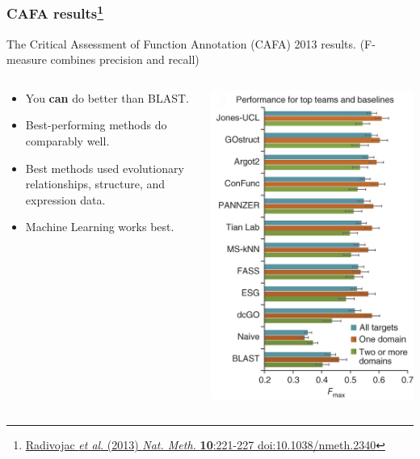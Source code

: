 \begin{frame}
  \frametitle{CAFA results\footnote{\tiny{\href{http://dx.doi.org/10.1038/nmeth.2340}{Radivojac \textit{et al}. (2013) \textit{Nat. Meth.} \textbf{10}:221-227 doi:10.1038/nmeth.2340}}}}
  The Critical Assessment of Function Annotation (CAFA) 2013 results. {\tiny(F-measure combines precision and recall)}
  \begin{columns}[T]
    \begin{column}{5cm}  
      \begin{itemize}  
        \item You \textbf{can} do better than BLAST.
        \item Best-performing methods do comparably well.
        \item Best methods used evolutionary relationships, structure, and expression data.
        \item Machine Learning works best.
      \end{itemize}
    \end{column}
    \begin{column}{5cm}      
      \includegraphics[height=0.65\textheight]{images/cafa_results}
    \end{column}
  \end{columns}         
\end{frame}